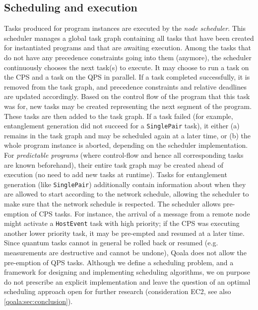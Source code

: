 \subsection{Scheduling and execution}
\label{qoala:sec:scheduling}
Tasks produced for program instances are executed by the \textit{node scheduler}.
This scheduler manages a global task graph containing all tasks that have been created for instantiated programs and that are awaiting execution.
Among the tasks that do not have any precedence constraints going into them (anymore), the scheduler continuously chooses the next task(s) to execute.
It may choose to run a task on the CPS and a task on the QPS in parallel.
If a task completed successfully, it is removed from the task graph, and precedence constraints and relative deadlines are updated accordingly.
Based on the control flow of the program that this task was for, new tasks may be created representing the next segment of the program.
These tasks are then added to the task graph.
If a task failed (for example, entanglement generation did not succeed for a \texttt{SinglePair} task), it either (a) remains in the task graph and may be scheduled again at a later time,
or (b) the whole program instance is aborted, depending on the scheduler implementation.
For \textit{predictable programs} (where control-flow and hence all corresponding tasks are known beforehand), their entire task graph may be created ahead of execution (no need to add new tasks at runtime).
Tasks for entanglement generation (like \texttt{SinglePair}) additionally contain information about when they are allowed to start according to the network schedule,
allowing the scheduler to make sure that the network schedule is respected.
The scheduler allows pre-emption of CPS tasks.
For instance, the arrival of a message from a remote node might activate a \texttt{HostEvent} task with high priority;
if the CPS was executing another lower priority task, it may be pre-empted and resumed at a later time.
Since quantum tasks cannot in general be rolled back or resumed (e.g. measurements are destructive and cannot be undone), Qoala does not allow the pre-emption of QPS tasks.
Although we define a scheduling problem, and a framework for designing and implementing scheduling algorithms,
we on purpose do not prescribe an explicit implementation and leave the question of an optimal scheduling approach open for further research (consideration EC2, see also \cref{qoala:sec:conclusion}).
